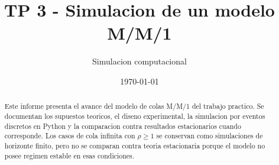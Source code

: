 \documentclass[11pt]{article}
\title{TP 3 - Simulacion de un modelo M/M/1}
\author{Simulacion computacional}
\date{\today}
\begin{document}
\maketitle
\begin{abstract}
Este informe presenta el avance del modelo de colas M/M/1 del trabajo practico. Se documentan los supuestos teoricos, el diseno experimental, la simulacion por eventos discretos en Python y la comparacion contra resultados estacionarios cuando corresponde. Los casos de cola infinita con $\rho \geq 1$ se conservan como simulaciones de horizonte finito, pero no se comparan contra teoria estacionaria porque el modelo no posee regimen estable en esas condiciones.
\end{abstract}





\end{document}
